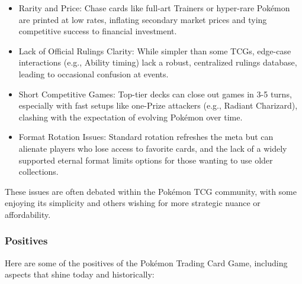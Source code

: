 \begin{itemize}
\item Rarity and Price: Chase cards like full-art Trainers or hyper-rare Pokémon are printed at low rates, inflating secondary market prices and tying competitive success to financial investment.
\item Lack of Official Rulings Clarity: While simpler than some TCGs, edge-case interactions (e.g., Ability timing) lack a robust, centralized rulings database, leading to occasional confusion at events.
\item Short Competitive Games: Top-tier decks can close out games in 3-5 turns, especially with fast setups like one-Prize attackers (e.g., Radiant Charizard), clashing with the expectation of evolving Pokémon over time.
\item Format Rotation Issues: Standard rotation refreshes the meta but can alienate players who lose access to favorite cards, and the lack of a widely supported eternal format limits options for those wanting to use older collections.
\end{itemize}

These issues are often debated within the Pokémon TCG community, with some enjoying its simplicity and others wishing for more strategic nuance or affordability.

\subsubsection{Positives}

Here are some of the positives of the Pokémon Trading Card Game, including aspects that shine today and historically:

